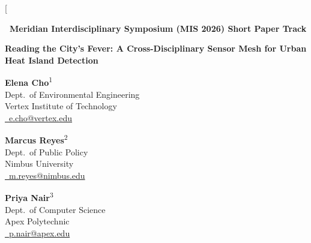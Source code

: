 \documentclass[10pt,twocolumn]{article}
\newcommand{\affmark}[1]{\textsuperscript{#1}}
\begin{document}
\makeatletter
\twocolumn[{%
\begin{@twocolumnfalse}

\begin{flushright}
\end{flushright}

\vspace{-0.3cm}
{\footnotesize\color{coral}\bfseries \faCalendar\ Meridian Interdisciplinary Symposium (MIS 2026) \quad \textbar\quad Short Paper Track}

\vspace{0.35cm}
{\color{deepteal}\Huge\bfseries Reading the City's Fever: A Cross-Disciplinary Sensor Mesh for Urban Heat Island Detection\par}

\vspace{0.45cm}

\noindent
\begin{minipage}[t]{0.32\textwidth}
\centering
\textbf{Elena Cho}\affmark{1}\\
\small Dept.\ of Environmental Engineering\\
Vertex Institute of Technology\\
\href{mailto:e.cho@vertex.edu}{\faEnvelope\ e.cho@vertex.edu}
\end{minipage}\hfill
\begin{minipage}[t]{0.32\textwidth}
\centering
\textbf{Marcus Reyes}\affmark{2}\\
\small Dept.\ of Public Policy\\
Nimbus University\\
\href{mailto:m.reyes@nimbus.edu}{\faEnvelope\ m.reyes@nimbus.edu}
\end{minipage}\hfill
\begin{minipage}[t]{0.32\textwidth}
\centering
\textbf{Priya Nair}\affmark{3}\\
\small Dept.\ of Computer Science\\
Apex Polytechnic\\
\href{mailto:p.nair@apex.edu}{\faEnvelope\ p.nair@apex.edu}
\end{minipage}


\end{@twocolumnfalse}}
\end{document}
